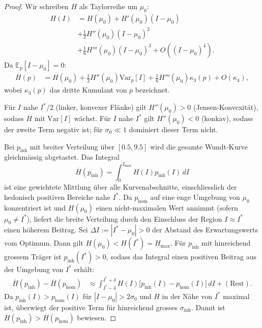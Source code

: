 ﻿\documentclass[12pt,a4paper]{article}
\theoremstyle{definition}
\newcommand{\E}{\mathbb{E}}
\newcommand{\Var}{\mathrm{Var}}
\newcommand{\MHI}{\overline{H}}
\begin{document}
\begin{proof}
Wir schreiben $H$ als Taylorreihe um $\mu_0$:
\begin{align*}
  H(I) &= H(\mu_0) + H'(\mu_0)(I - \mu_0) \\ &+ \tfrac{1}{2}H''(\mu_0)(I-\mu_0)^2 \\
          &+ \tfrac{1}{6}H'''(\mu_0)(I-\mu_0)^3 + O((I-\mu_0)^4).
\end{align*}
Da $\E_{p}[I - \mu_0] = 0$:
\begin{align}
  \MHI(p) &= H(\mu_0) + \tfrac{1}{2}H''(\mu_0)\Var_p[I]
             + \tfrac{1}{6}H'''(\mu_0)\kappa_3(p) + O(\kappa_4),
  \label{eq:mhi_taylor}
\end{align}
wobei $\kappa_3(p)$ das dritte Kumulant von $p$ bezeichnet.

Für $I$ nahe $I^*/2$ (linker, konvexer Flänke) gilt $H''(\mu_0) > 0$
(Jensen-Konvexität), sodass $\MHI$ mit $\Var[I]$ wächst.
Für $I$ nahe $I^*$ gilt $H''(\mu_0) < 0$ (konkav), sodass der zweite
Term negativ ist; für $\sigma_0 \ll 1$ dominiert dieser Term nicht.

Bei $p_{\mathrm{inh}}$ mit breiter Verteilung über $[0.5, 9.5]$ wird
die gesamte Wundt-Kurve gleichmässig abgetastet. Das Integral
\[
  \MHI(p_{\mathrm{inh}}) = \int_0^{I_{\max}} H(I) p_{\mathrm{inh}}(I)\, dI
\]
ist eine gewichtete Mittlung über alle Kurvenabschnitte, einschliesslich
der hedonisch positiven Bereiche nahe $I^*$. Da $p_{\mathrm{hom}}$
auf eine enge Umgebung von $\mu_0$ konzentriert ist und $H(\mu_0)$ einen
nicht-maximalen Wert annimmt (sofern $\mu_0 \neq I^*$), liefert die
breite Verteilung durch den Einschluss der Region $I \approx I^*$ einen
höherem Beitrag. Sei $\Delta I := |I^* - \mu_0| > 0$ der Abstand des
Erwartungswerts vom Optimum. Dann gilt $H(\mu_0) < H(I^*) = H_{\max}$.
Für $p_{\mathrm{inh}}$ mit hinreichend grossem Träger ist
$p_{\mathrm{inh}}(I^*) > 0$, sodass das Integral einen positiven Beitrag
aus der Umgebung von $I^*$ erhält:
\begin{align*}
  \MHI(p_{\mathrm{inh}}) - \MHI(p_{\mathrm{hom}})
  &\approx \int_{I^* - \delta}^{I^* + \delta}
      H(I)\bigl[p_{\mathrm{inh}}(I) - p_{\mathrm{hom}}(I)\bigr]\, dI
  + (\text{Rest}).
\end{align*}
Da $p_{\mathrm{inh}}(I) > p_{\mathrm{hom}}(I)$ für $|I - \mu_0| > 2\sigma_0$
und $H$ in der Nähe von $I^*$ maximal ist, überwiegt der positive Term
für hinreichend grosses $\sigma_{\mathrm{inh}}$. Damit ist
$\MHI(p_{\mathrm{inh}}) > \MHI(p_{\mathrm{hom}})$ bewiesen.
\end{proof}
\end{document}
